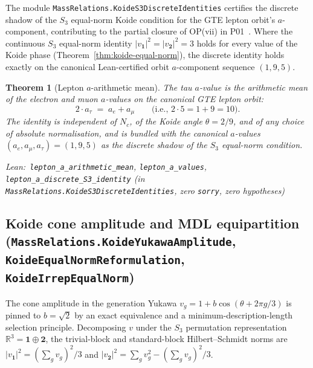 \documentclass[11pt,a4paper]{article}
\newenvironment{leanref}%
  {\par\smallskip\noindent\begingroup\raggedright\textup{Lean:}~}%
  {\par\endgroup}
\newtheorem{theorem}{Theorem}[section]
\theoremstyle{definition}
\begin{document}
The module \texttt{MassRelations.KoideS3DiscreteIdentities} certifies the discrete
shadow of the $S_3$ equal-norm Koide condition for the GTE lepton orbit's
$a$-component, contributing to the partial closure of OP(vii) in
P01~\cite{Spivack2026_SM_UGP}.  Where the continuous $S_3$ equal-norm identity
$|v_{\mathbf{1}}|^2 = |v_{\mathbf{2}}|^2 = 3$ holds for every value of the Koide
phase (Theorem~\ref{thm:koide-equal-norm}), the discrete identity holds exactly
on the canonical Lean-certified orbit $a$-component sequence $(1, 9, 5)$.

\begin{theorem}[Lepton $a$-arithmetic mean]\label{thm:lepton_a_mean}
The tau $a$-value is the arithmetic mean of the electron and muon $a$-values
on the canonical GTE lepton orbit:
\[
2 \cdot a_\tau \;=\; a_e + a_\mu \qquad \text{(i.e., } 2 \cdot 5 = 1 + 9 = 10\text{).}
\]
The identity is independent of $N_c$, of the Koide angle $\theta = 2/9$, and
of any choice of absolute normalisation, and is bundled with the canonical
$a$-values $(a_e, a_\mu, a_\tau) = (1, 9, 5)$ as the discrete shadow of the
$S_3$ equal-norm condition.

\begin{leanref}\lstinline|lepton_a_arithmetic_mean|,
\lstinline|lepton_a_values|,
\lstinline|lepton_a_discrete_S3_identity|
\textup{(in \texttt{MassRelations.KoideS3DiscreteIdentities},
zero \texttt{sorry}, zero hypotheses)}\end{leanref}
\end{theorem}

\subsection{Koide cone amplitude and MDL equipartition (\texttt{MassRelations.KoideYukawaAmplitude}, \texttt{KoideEqualNormReformulation}, \texttt{KoideIrrepEqualNorm})}\label{subsec:koide-amplitude}

The cone amplitude in the generation Yukawa
$v_g = 1 + b\cos(\theta + 2\pi g/3)$ is pinned to $b = \sqrt{2}$ by an exact
equivalence and a minimum-description-length selection principle.  Decomposing
$v$ under the $S_3$ permutation representation $\mathbb{R}^3 = \mathbf{1}\oplus\mathbf{2}$,
the trivial-block and standard-block Hilbert--Schmidt norms are
$|v_{\mathbf 1}|^2 = (\textstyle\sum_g v_g)^2/3$ and
$|v_{\mathbf 2}|^2 = \sum_g v_g^2 - (\sum_g v_g)^2/3$.
\end{document}
